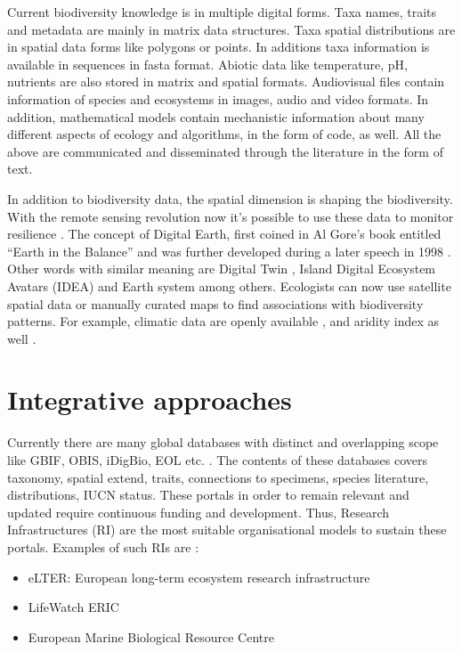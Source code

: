 Current biodiversity knowledge is in multiple digital forms. 
Taxa names, traits and metadata are mainly in matrix data
structures. Taxa spatial distributions are in spatial data
forms like polygons or points. In additions taxa information
is available in sequences in fasta format. Abiotic data like 
temperature, pH, nutrients are also stored in matrix
and spatial formats. Audiovisual files contain information
of species and ecosystems in images, audio and video formats.
In addition, mathematical models contain mechanistic information
about many different aspects of ecology and algorithms, in the 
form of code, as well. All the above are communicated and disseminated through the
literature in the form of text.

In addition to biodiversity data, the spatial dimension is shaping the biodiversity.
With the remote sensing revolution now
it's possible to use these data to monitor resilience \parencite{Lenton2022resilience}. 
The concept of Digital Earth, first coined in Al Gore’s book entitled 
“Earth in the Balance” and was further developed
during a later speech in 1998 \parencite{Goodchild_2012}. Other words with
similar meaning are Digital Twin \parencite{barros2024digital},
Island Digital Ecosystem Avatars (IDEA) \parencite{Davies2016} and
Earth system \parencite{mahecha2020earth} among others.
Ecologists can now use satellite spatial data or manually curated maps 
to find associations with biodiversity patterns. 
For example, climatic data are openly available \parencite{Fick2017}, 
and aridity index as well \parencite{zomer2022version}.

\section{Integrative approaches}
\label{sec:approachintegration}

Currently there are many global databases with distinct and overlapping 
scope like GBIF, OBIS, iDigBio, EOL etc. \parencite{feng2022Review}. 
The contents of these databases covers taxonomy, spatial extend, traits, 
connections to specimens, species literature, distributions,
IUCN status. These portals in order to remain relevant and updated require 
continuous funding and development. Thus, Research Infrastructures (RI) are 
the most suitable organisational models to sustain these portals. Examples 
of such RIs are :

\begin{itemize}

    \item eLTER: European long-term ecosystem research infrastructure 
    \item LifeWatch ERIC
    \item European Marine Biological Resource Centre

\end{itemize}

